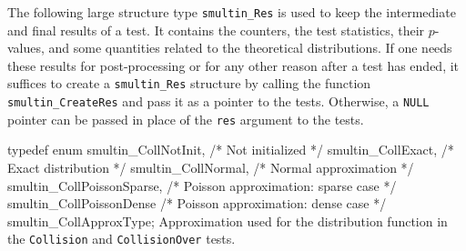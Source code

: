  The following large structure type {\tt smultin\_Res} is used to 
 keep the intermediate and final results of a test.
 It contains the counters, the test statistics, their $p$-values,
 and some quantities related to the theoretical distributions.
 If one needs these results for post-processing or for any
 other reason after a test has ended, it suffices to create  a
 {\tt smultin\_Res} structure by calling the function 
 {\tt smultin\_CreateRes}  and pass it as a pointer to the tests. 
 Otherwise, a {\tt NULL} pointer can be passed in place of the {\tt res}
 argument to the tests.

\code

typedef enum {
   smultin_CollNotInit,           /* Not initialized */
   smultin_CollExact,             /* Exact distribution */
   smultin_CollNormal,            /* Normal approximation */
   smultin_CollPoissonSparse,     /* Poisson approximation: sparse case */
   smultin_CollPoissonDense       /* Poisson approximation: dense case */
} smultin_CollApproxType;
\endcode
  \tab
   Approximation used for the distribution function in the
       {\tt Collision} and  {\tt CollisionOver} tests.
  \endtab
\code


